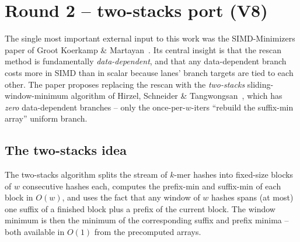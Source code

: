\section{Round 2 -- two-stacks port (V8)}
\label{sec:v8-two-stack}

The single most important external input to this work was the
SIMD-Minimizers paper of Groot Koerkamp \&
Martayan~\cite{groot_koerkamp_simd_minimizers_2025}.  Its central
insight is that the rescan method is fundamentally
\emph{data-dependent}, and that any data-dependent branch costs more
in SIMD than in scalar because lanes' branch targets are tied to
each other.  The paper proposes replacing the rescan with the
\emph{two-stacks} sliding-window-minimum algorithm of Hirzel,
Schneider \& Tangwongsan~\cite{hirzel_two_stacks_2017}, which has
\emph{zero} data-dependent branches -- only the once-per-$w$-iters
``rebuild the suffix-min array'' uniform branch.

\subsection{The two-stacks idea}

The two-stacks algorithm splits the stream of $k$-mer hashes into
fixed-size blocks of $w$ consecutive hashes each, computes the
prefix-min and suffix-min of each block in $O(w)$, and uses the fact
that any window of $w$ hashes spans (at most) one suffix of a
finished block plus a prefix of the current block.  The window
minimum is then the minimum of the corresponding suffix and prefix
minima -- both available in $O(1)$ from the precomputed arrays.

